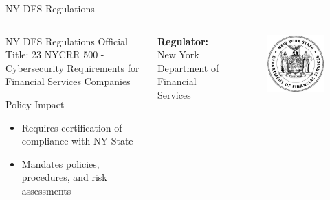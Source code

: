 \documentclass[10pt]{beamer}
\begin{document}
\begin{frame}{NY DFS Regulations}
  \begin{columns}
      \begin{exampleblock}{NY DFS Regulations}
        Official Title: 23 NYCRR 500 - Cybersecurity Requirements for Financial Services Companies
        \begin{center}Policy Impact\end{center}
        \begin{itemize}
        \item{Requires certification of compliance with NY State}
        \item{Mandates policies, procedures, and risk assessments}
        \end{itemize}
      \end{exampleblock}
    \textbf{Regulator:} New York Department of Financial Services
        \begin{figure}
    	\includegraphics[width=\textwidth]{Figures/NY_DFS.jpg}
        \end{figure}    
  \end{columns}
\end{frame}
\end{document}
